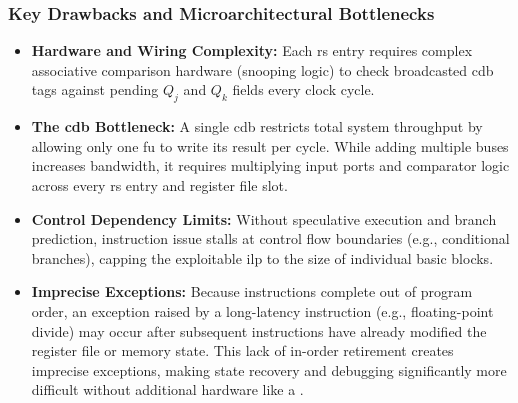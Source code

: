 \subsubsection{Key Drawbacks and Microarchitectural Bottlenecks}
\begin{itemize}
    \item \textbf{Hardware and Wiring Complexity:} Each \gls{rs} entry requires complex associative comparison hardware (snooping logic) to check broadcasted \gls{cdb} tags against pending $Q_j$ and $Q_k$ fields every clock cycle.
    \item \textbf{The \gls{cdb} Bottleneck:} A single \gls{cdb} restricts total system throughput by allowing only one \gls{fu} to write its result per cycle. While adding multiple buses increases bandwidth, it requires multiplying input ports and comparator logic across every \gls{rs} entry and register file slot.
    \item \textbf{Control Dependency Limits:} Without speculative execution and branch prediction, instruction issue stalls at control flow boundaries (e.g., conditional branches), capping the exploitable \gls{ilp} to the size of individual basic blocks.
    \item \textbf{Imprecise Exceptions:} Because instructions complete out of program order, an exception raised by a long-latency instruction (e.g., floating-point divide) may occur after subsequent instructions have already modified the register file or memory state. This lack of in-order retirement creates imprecise exceptions, making state recovery and debugging significantly more difficult without additional hardware like a .
\end{itemize}